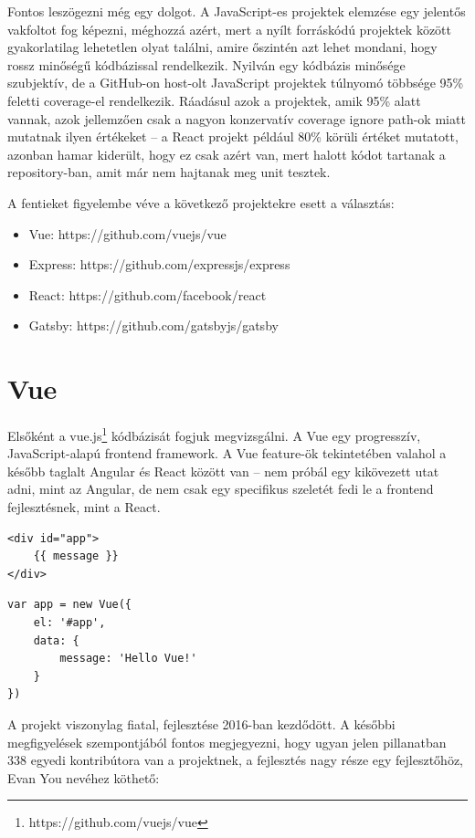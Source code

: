Fontos leszögezni még egy dolgot. A JavaScript-es projektek elemzése egy jelentős vakfoltot fog képezni, méghozzá azért, mert a nyílt forráskódú projektek között gyakorlatilag lehetetlen olyat találni, amire őszintén azt lehet mondani, hogy rossz minőségű kódbázissal rendelkezik. Nyilván egy kódbázis minősége szubjektív, de a GitHub-on host-olt JavaScript projektek túlnyomó többsége 95\% feletti coverage-el rendelkezik. Ráadásul azok a projektek, amik 95\% alatt vannak, azok jellemzően csak a nagyon konzervatív coverage ignore path-ok miatt mutatnak ilyen értékeket -- a React projekt például 80\% körüli értéket mutatott, azonban hamar kiderült, hogy ez csak azért van, mert halott kódot tartanak a repository-ban, amit már nem hajtanak meg unit tesztek.

A fentieket figyelembe véve a következő projektekre esett a választás:
\begin{itemize}
    \item Vue: https://github.com/vuejs/vue
    \item Express: https://github.com/expressjs/express
    \item React: https://github.com/facebook/react
    \item Gatsby: https://github.com/gatsbyjs/gatsby
\end{itemize}

\section{Vue}

Elsőként a vue.js\footnote{https://github.com/vuejs/vue} kódbázisát fogjuk megvizsgálni. A Vue egy progresszív, JavaScript-alapú frontend framework. A Vue feature-ök tekintetében valahol a később taglalt Angular és React között van -- nem próbál egy kikövezett utat adni, mint az Angular, de nem csak egy specifikus szeletét fedi le a frontend fejlesztésnek, mint a React.

\begin{lstlisting}
<div id="app">
    {{ message }}
</div>
\end{lstlisting}

\begin{lstlisting}
var app = new Vue({
    el: '#app',
    data: {
        message: 'Hello Vue!'
    }
})
\end{lstlisting}

A projekt viszonylag fiatal, fejlesztése 2016-ban kezdődött. A későbbi megfigyelések szempontjából fontos megjegyezni, hogy ugyan jelen pillanatban 338 egyedi kontribútora van a projektnek, a fejlesztés nagy része egy fejlesztőhöz, Evan You nevéhez köthető:

